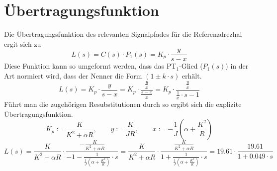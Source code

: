 \section{Übertragungsfunktion}
Die Übertragungsfunktion des relevanten Signalpfades für die Referenzdrezhal
ergit sich zu
\[
	L(s) = C(s) \cdot P_1(s) = K_p \cdot \frac{y}{s-x}
\]
Diese Funktion kann so umgeformt werden, dass das PT$_1$-Glied ($P_1(s)$)
in der Art normiert wird, dass der Nenner die Form $(1 \pm k \cdot s)$ erhält.
\[
	L(s) = K_p \cdot \frac{y}{s-x} =
	K_p \cdot \frac{\frac{y}{x}}{\frac{s-x}{x}} =
	K_p \cdot \frac{\frac{y}{x}}{\frac{1}{x} \cdot s -1}
\]
Führt man die zugehörigen Resubstitutionen durch so ergibt sich die explizite
Übertragungsfunktion.
\[
	K_p := \frac{K}{K^2 + \alpha R}, \qquad
	y := \frac{K}{J R}, \qquad
	x := -\frac{1}{J} \left( \alpha + \frac{K^2}{R} \right)
\]
\[
	L(s) 
	= \frac{K}{K^2 + \alpha R} \cdot \frac{
			-\frac{K}{K^2 + \alpha R}
		}{
			-1 - \frac{1}{\frac{1}{J} \left(
				\alpha + \frac{K^2}{R}
			\right)} \cdot s
		}
	= \frac{K}{K^2 + \alpha R} \cdot \frac{
			\frac{K}{K^2 + \alpha R}
		}{
			1 + \frac{1}{\frac{1}{J} \left(
				\alpha + \frac{K^2}{R}
			\right)} \cdot s
		}
	= 19.61 \cdot \frac{19.61}{1 + 0.049 \cdot s}
\]
